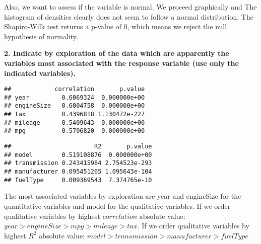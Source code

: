\documentclass[
]{article}
\newenvironment{Shaded}{\begin{snugshade}}{\end{snugshade}}
\newcommand{\CommentTok}[1]{\textcolor[rgb]{0.56,0.35,0.01}{\textit{#1}}}
\newcommand{\DecValTok}[1]{\textcolor[rgb]{0.00,0.00,0.81}{#1}}
\newcommand{\FunctionTok}[1]{\textcolor[rgb]{0.00,0.00,0.00}{#1}}
\newcommand{\NormalTok}[1]{#1}
\newcommand{\SpecialCharTok}[1]{\textcolor[rgb]{0.00,0.00,0.00}{#1}}
\begin{document}
Also, we want to assess if the variable is normal. We proceed
graphically and The histogram of densities clearly does not seem to
follow a normal distribution. The Shapiro-Wilk test returns a p-value of
0, which means we reject the null hypothesis of normality.

\newpage

\textbf{2. Indicate by exploration of the data which are apparently the variables most associated with the
response variable (use only the indicated variables).}

\begin{Shaded}
\end{Shaded}

\begin{verbatim}
##            correlation       p.value
## year         0.6069324  0.000000e+00
## engineSize   0.6004758  0.000000e+00
## tax          0.4396818 1.130472e-227
## mileage     -0.5409643  0.000000e+00
## mpg         -0.5706820  0.000000e+00
\end{verbatim}

\begin{Shaded}
\end{Shaded}

\begin{verbatim}
##                       R2       p.value
## model        0.519108876  0.000000e+00
## transmission 0.243415984 2.754523e-293
## manufacturer 0.095451265 1.095643e-104
## fuelType     0.009369543  7.374765e-10
\end{verbatim}

The most associated variables by exploration are year and engineSize for
the quantitative variables and model for the qualitative variables.
\newline If we order qualitative variables by highest \(correlation\)
absolute value: \(year > engineSize > mpg > mileage > tax\). \newline If
we order qualitative variables by highest \(R^2\) absolute value:
\(model > transmission > manufacturer > fuelType\)
\end{document}
